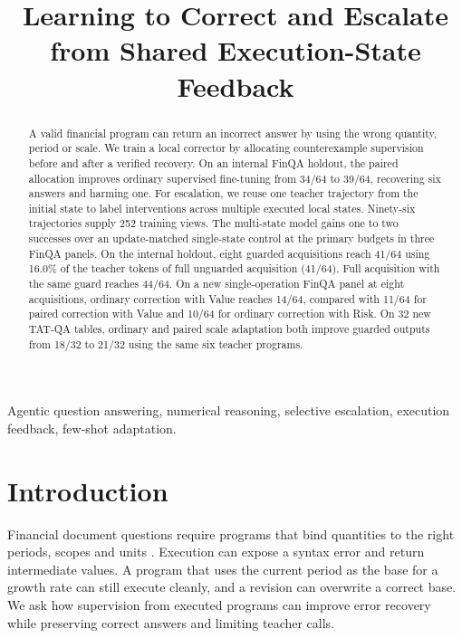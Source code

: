 \documentclass[10pt,letterpaper,conference]{IEEEtran}
\begin{document}
\title{Learning to Correct and Escalate from Shared Execution-State Feedback}
\author{}
\maketitle
\begin{abstract}
A valid financial program can return an incorrect answer by using the wrong quantity, period or scale. We train a local corrector by allocating counterexample supervision before and after a verified recovery. On an internal FinQA holdout, the paired allocation improves ordinary supervised fine-tuning from 34/64 to 39/64, recovering six answers and harming one. For escalation, we reuse one teacher trajectory from the initial state to label interventions across multiple executed local states. Ninety-six trajectories supply 252 training views. The multi-state model gains one to two successes over an update-matched single-state control at the primary budgets in three FinQA panels. On the internal holdout, eight guarded acquisitions reach 41/64 using 16.0\% of the teacher tokens of full unguarded acquisition (41/64). Full acquisition with the same guard reaches 44/64. On a new single-operation FinQA panel at eight acquisitions, ordinary correction with Value reaches 14/64, compared with 11/64 for paired correction with Value and 10/64 for ordinary correction with Risk. On 32 new TAT-QA tables, ordinary and paired scale adaptation both improve guarded outputs from 18/32 to 21/32 using the same six teacher programs.
\end{abstract}
\begin{IEEEkeywords}
Agentic question answering, numerical reasoning, selective escalation, execution feedback, few-shot adaptation.
\end{IEEEkeywords}
\section{Introduction}\label{introduction}

Financial document questions require programs that bind quantities to the right periods, scopes and units \cite{r1,r2}. Execution can expose a syntax error and return intermediate values. A program that uses the current period as the base for a growth rate can still execute cleanly, and a revision can overwrite a correct base. We ask how supervision from executed programs can improve error recovery while preserving correct answers and limiting teacher calls.
\end{document}
